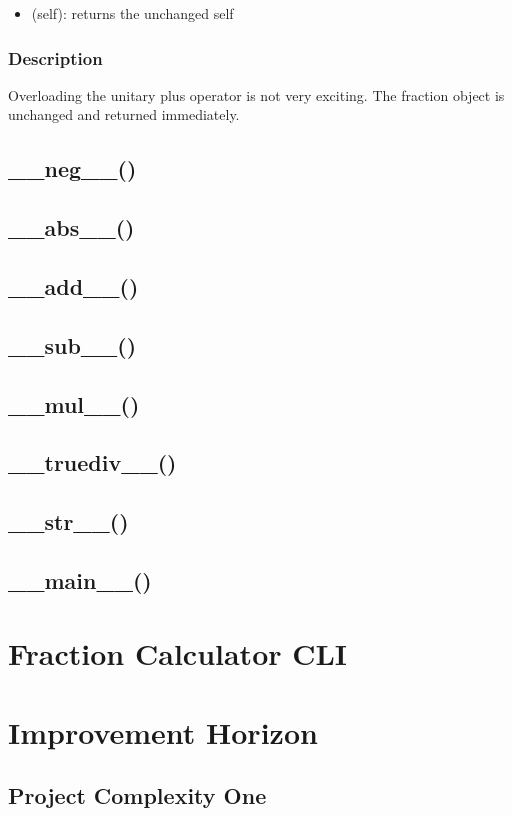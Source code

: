 \documentclass[refman]{scrartcl}
\begin{document}
\begin{itemize}
  \item (self): returns the unchanged self
\end{itemize}

\subsubsection*{Description}

Overloading the unitary plus operator is not very exciting. The fraction object is unchanged and returned immediately.

\subsection{\_\_neg\_\_()}

\subsection{\_\_abs\_\_()}

\subsection{\_\_add\_\_()}

\subsection{\_\_sub\_\_()}

\subsection{\_\_mul\_\_()}

\subsection{\_\_truediv\_\_()}

\subsection{\_\_str\_\_()}

\subsection{\_\_main\_\_()}

\section{Fraction Calculator CLI}

\section{Improvement Horizon}

\subsection{Project Complexity One}

\subsection{}
\end{document}
